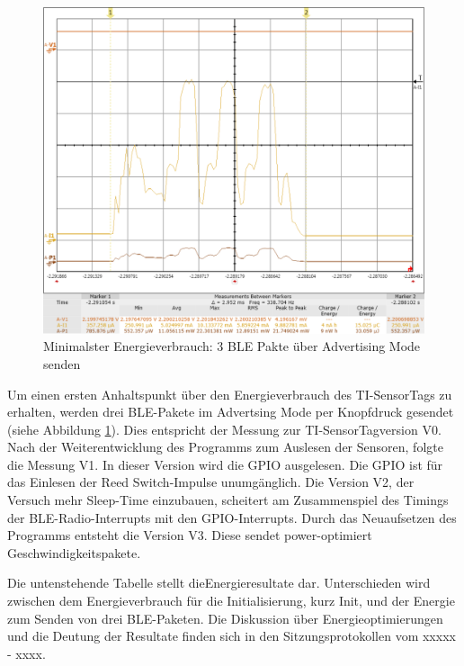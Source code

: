 \begin{figure}[ht]
    \includegraphics[width=1.0\textwidth]{3Vorgehen/imag/v0Send33uJ.png} 
    \caption{Minimalster Energieverbrauch: 3 BLE Pakte über Advertising Mode senden}
    \label{BLE_send}
\end{figure}

Um einen ersten Anhaltspunkt über den Energieverbrauch des TI-SensorTags zu erhalten, werden drei BLE-Pakete im Advertsing Mode per Knopfdruck gesendet (siehe Abbildung \ref{BLE_send}). Dies entspricht der Messung zur TI-SensorTagversion V0. Nach der Weiterentwicklung des Programms zum Auslesen der Sensoren, folgte die Messung V1. In dieser Version wird die GPIO ausgelesen. Die GPIO ist für das Einlesen der Reed Switch-Impulse unumgänglich. Die Version V2, der Versuch mehr Sleep-Time einzubauen, scheitert am Zusammenspiel des Timings der BLE-Radio-Interrupts mit den GPIO-Interrupts. Durch das Neuaufsetzen des Programms entsteht die Version V3. Diese sendet power-optimiert Geschwindigkeitspakete. 

Die untenstehende Tabelle stellt dieEnergieresultate dar. Unterschieden wird zwischen dem Energieverbrauch für die Initialisierung, kurz Init, und der Energie zum Senden von drei BLE-Paketen. Die Diskussion über Energieoptimierungen und die Deutung der Resultate finden sich in den Sitzungsprotokollen vom xxxxx - xxxx. 


